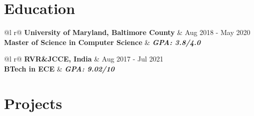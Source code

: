 \documentclass[a4paper,3pt]{article}
\begin{document}
\section{Education}
\begin{tabularx}{\linewidth}{ @{}l r@{} }
\color[HTML]{1C033C} \textbf{University of Maryland, Baltimore County} & \hfill  Aug 2018 - May 2020 \\
\textbf{Master of Science in Computer Science} & \hfill \textit{\textbf{GPA: 3.8/4.0}} \\
\end{tabularx}
\begin{tabularx}{\linewidth}{ @{}l r@{} }
\color[HTML]{1C033C} \textbf{RVR\&JCCE, India} & \hfill  Aug 2017 - Jul 2021 \\
\textbf{BTech in ECE} & \hfill \textit{\textbf{GPA: 9.02/10}} \\
\end{tabularx}

\section{Projects}
\end{document}
